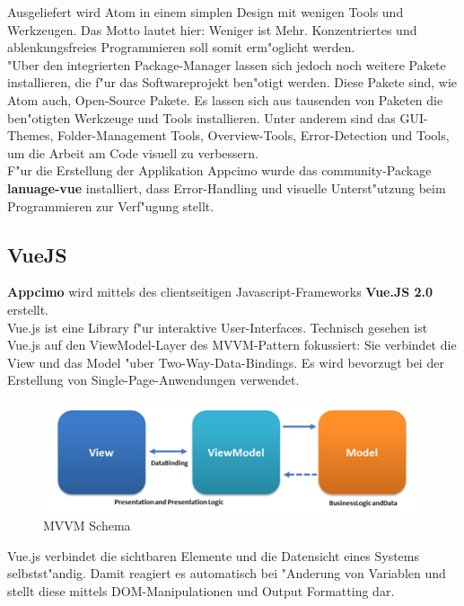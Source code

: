 \documentclass[a4paper, 11pt]{scrreprt}
\begin{document}
Ausgeliefert wird Atom in einem simplen Design mit wenigen Tools und Werkzeugen. Das Motto lautet hier: Weniger ist Mehr. Konzentriertes und ablenkungsfreies Programmieren soll somit erm"oglicht werden. \\"Uber den integrierten Package-Manager lassen sich jedoch noch weitere Pakete installieren, die f"ur das Softwareprojekt ben"otigt werden. Diese Pakete sind, wie Atom auch, Open-Source Pakete. Es lassen sich aus tausenden von Paketen die ben"otigten Werkzeuge und Tools installieren. Unter anderem sind das GUI-Themes, Folder-Management Tools, Overview-Tools, Error-Detection und Tools, um die Arbeit am Code visuell zu verbessern.\\

F"ur die Erstellung der Applikation Appcimo wurde das community-Package \textbf{lanuage-vue} installiert, dass Error-Handling und visuelle Unterst"utzung beim Programmieren zur Verf"ugung stellt.


\subsection{VueJS}
\textbf{Appcimo} wird mittels des clientseitigen Javascript-Frameworks \textbf{Vue.JS 2.0} erstellt. \\

Vue.js ist eine Library f"ur interaktive User-Interfaces. Technisch gesehen ist Vue.js auf den ViewModel-Layer des MVVM-Pattern fokussiert: Sie verbindet die View und das Model "uber Two-Way-Data-Bindings. Es wird bevorzugt bei der Erstellung von Single-Page-Anwendungen verwendet.

\begin{figure} [h]
\begin{center}


\includegraphics[width=12cm]{mvvm.png}
\caption{MVVM Schema}
\label{mvvm}

\end{center}
\end{figure}

Vue.js verbindet die sichtbaren Elemente und die Datensicht eines Systems selbstst"andig. Damit reagiert es automatisch bei "Anderung von Variablen und  stellt diese mittels DOM-Manipulationen und Output Formatting dar.\\
\end{document}
